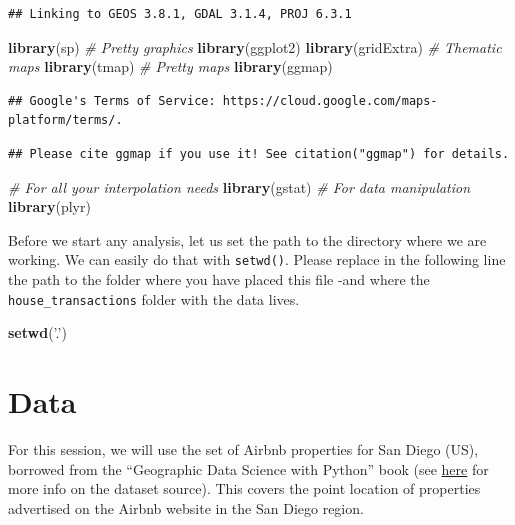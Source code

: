 \documentclass[
]{book}
\newenvironment{Shaded}{\begin{snugshade}}{\end{snugshade}}
\newcommand{\CommentTok}[1]{\textcolor[rgb]{0.56,0.35,0.01}{\textit{#1}}}
\newcommand{\KeywordTok}[1]{\textcolor[rgb]{0.13,0.29,0.53}{\textbf{#1}}}
\newcommand{\NormalTok}[1]{#1}
\newcommand{\StringTok}[1]{\textcolor[rgb]{0.31,0.60,0.02}{#1}}
\begin{document}
\begin{verbatim}
## Linking to GEOS 3.8.1, GDAL 3.1.4, PROJ 6.3.1
\end{verbatim}

\begin{Shaded}
\begin{Highlighting}[]
\KeywordTok{library}\NormalTok{(sp)}
\CommentTok{# Pretty graphics}
\KeywordTok{library}\NormalTok{(ggplot2)}
\KeywordTok{library}\NormalTok{(gridExtra)}
\CommentTok{# Thematic maps}
\KeywordTok{library}\NormalTok{(tmap)}
\CommentTok{# Pretty maps}
\KeywordTok{library}\NormalTok{(ggmap)}
\end{Highlighting}
\end{Shaded}

\begin{verbatim}
## Google's Terms of Service: https://cloud.google.com/maps-platform/terms/.
\end{verbatim}

\begin{verbatim}
## Please cite ggmap if you use it! See citation("ggmap") for details.
\end{verbatim}

\begin{Shaded}
\begin{Highlighting}[]
\CommentTok{# For all your interpolation needs}
\KeywordTok{library}\NormalTok{(gstat)}
\CommentTok{# For data manipulation}
\KeywordTok{library}\NormalTok{(plyr)}
\end{Highlighting}
\end{Shaded}

Before we start any analysis, let us set the path to the directory where we are working. We can easily do that with \texttt{setwd()}. Please replace in the following line the path to the folder where you have placed this file -and where the \texttt{house\_transactions} folder with the data lives.

\begin{Shaded}
\begin{Highlighting}[]
\KeywordTok{setwd}\NormalTok{(}\StringTok{'.'}\NormalTok{)}
\end{Highlighting}
\end{Shaded}

\hypertarget{data}{%
\section{Data}\label{data}}

For this session, we will use the set of Airbnb properties for San Diego (US), borrowed from the ``Geographic Data Science with Python'' book (see \href{https://geographicdata.science/book/data/airbnb/regression_cleaning.html}{here} for more info on the dataset source). This covers the point location of properties advertised on the Airbnb website in the San Diego region.
\end{document}

